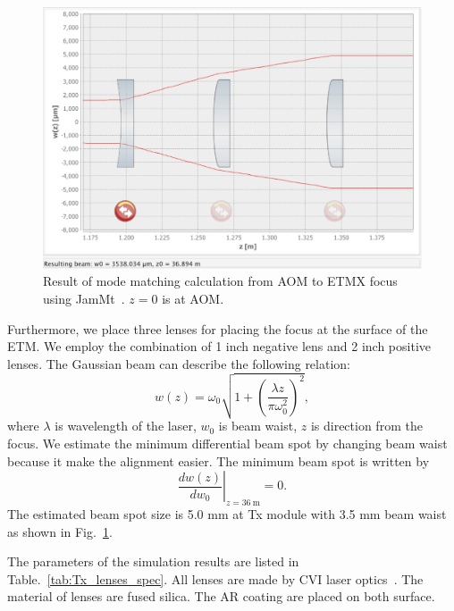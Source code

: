 \begin{figure}
\begin{center}
\includegraphics[bb=0 0 965 667, width=14cm]{Figures/ETMX_modematching_Xend.png}
\caption{Result of mode matching calculation from AOM to ETMX focus using JamMt~\cite{JamMt}. $z=0$ is at AOM. } 
\label{fig:Mode_L2} 
\end{center}
\end{figure}


Furthermore, we place three lenses for placing the focus at the surface of the ETM. We employ the combination of 1 inch negative lens and 2 inch positive lenses. The Gaussian beam can describe the following relation:
\begin{equation}
w(z)=\omega_0\sqrt{1+\left( \frac{\lambda z}{\pi \omega_0^2}\right)^2},
\end{equation}
where $\lambda$ is wavelength of the laser, $w_0$ is beam waist, $z$ is direction from the focus. We estimate the minimum differential beam spot by changing beam waist because it make the alignment easier. The minimum beam spot is written by 
\begin{equation}
\left .\frac{dw(z)}{dw_0} \right|_{z=36~\mathrm{m}}=0.
\end{equation}
The estimated beam spot size is 5.0 mm at Tx module with 3.5 mm beam waist as shown in Fig.~\ref{fig:Mode_L2}.


 The parameters of the simulation results are listed in Table.~\ref{tab:Tx_lenses_spec}. All lenses are made by CVI laser optics~\cite{CVI}. The material of lenses are fused silica. The AR coating are placed on both surface. 

